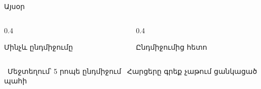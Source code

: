 \begin{frame}{Այսօր}
  \begin{columns}[T]
    \begin{column}{0.4\textwidth}
      \begin{card}[colback=lavender!45!cream]
        {\blackfont Մինչև ընդմիջումը}\par\smallskip
        \par\smallskip
      \end{card}
    \end{column}
    \begin{column}{0.4\textwidth}
      \begin{card}[colback=mint!45!cream]
        {\blackfont Ընդմիջումից հետո}\par\smallskip
        \par\smallskip
        \par\smallskip
      \end{card}
    \end{column}
  \end{columns}
  \vspace{1mm}
  \centering
  {\small {}\ Մեջտեղում՝ 5 րոպե ընդմիջում \quad {}\ Հարցերը գրեք չաթում ցանկացած պահի}
\end{frame}
